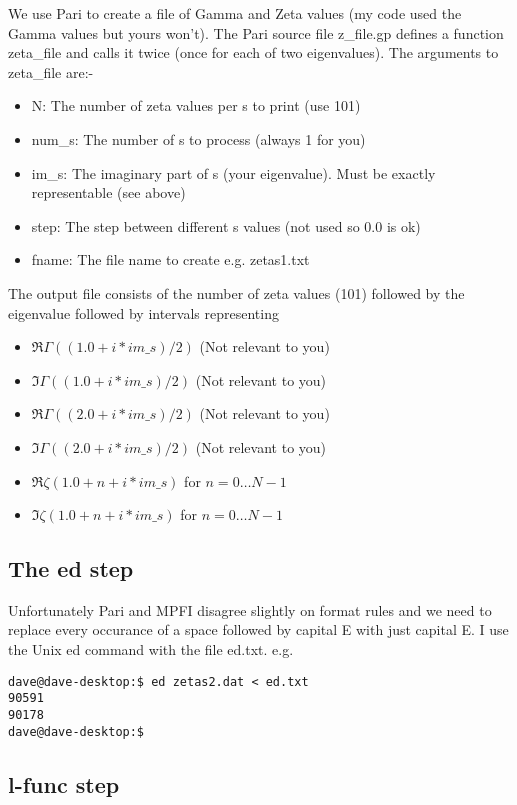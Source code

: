 \documentclass[12pt,a4paper]{article}
\begin{document}
We use Pari to create a file of Gamma and Zeta values (my code used the Gamma values but yours won't). The Pari source file z\_file.gp defines a function zeta\_file and calls it twice (once for each of two eigenvalues). The arguments to zeta\_file are:-
\begin{itemize}
\item N: The number of zeta values per s to print (use 101)
\item num\_s: The number of s to process (always 1 for you)
\item im\_s: The imaginary part of s (your eigenvalue). Must be exactly representable (see above)
\item step: The step between different s values (not used so 0.0 is ok)
\item fname: The file name to create e.g. zetas1.txt
\end {itemize}

The output file consists of the number of zeta values (101) followed by the eigenvalue followed by intervals representing
\begin{itemize}
\item $\Re\Gamma((1.0+i*im\_s)/2)$ (Not relevant to you)
\item $\Im\Gamma((1.0+i*im\_s)/2)$ (Not relevant to you)
\item $\Re\Gamma((2.0+i*im\_s)/2)$ (Not relevant to you)
\item $\Im\Gamma((2.0+i*im\_s)/2)$ (Not relevant to you)
\item $\Re\zeta(1.0+n+i*im\_s)$ for $n=0\ldots N-1$
\item $\Im\zeta(1.0+n+i*im\_s)$ for $n=0\ldots N-1$
\end{itemize}

\subsection{The ed step}

Unfortunately Pari and MPFI disagree slightly on format rules and we need to replace every occurance of a space followed by capital E with just capital E. I use the Unix ed command with the file ed.txt. e.g.
\begin{verbatim}
dave@dave-desktop:$ ed zetas2.dat < ed.txt 
90591
90178
dave@dave-desktop:$
\end{verbatim}

\subsection{l-func step}
\end{document}
